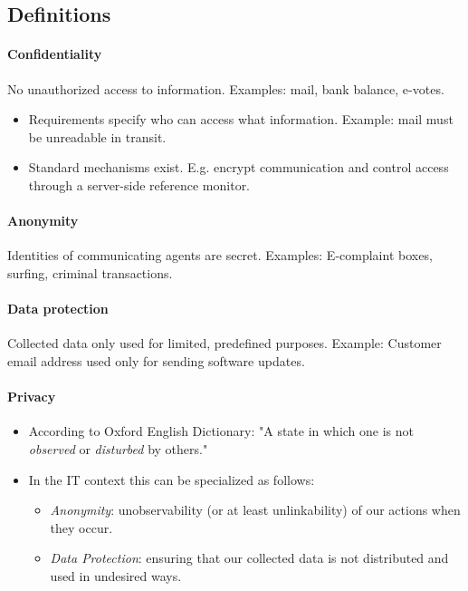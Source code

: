 \subsection{Definitions}

\paragraph{Confidentiality} No unauthorized access to information.
Examples: mail, bank balance, e-votes.

\begin{itemize}
    \item Requirements specify who can access what information.
    Example: mail must be unreadable in transit.
    \item Standard mechanisms exist. 
    E.g. encrypt communication and control access through a server-side reference monitor.
\end{itemize}

\paragraph{Anonymity} Identities of communicating agents are secret.
Examples: E-complaint boxes, surfing, criminal transactions.

\paragraph{Data protection} Collected data only used for limited, predefined purposes.
Example: Customer email address used only for sending software updates.

\paragraph{Privacy}

\begin{itemize}
    \item According to Oxford English Dictionary: "A state in which one is not \textit{observed} or \textit{disturbed} by others."
    \item In the IT context this can be specialized as follows:
    \begin{itemize}
        \item \emph{Anonymity}: unobservability (or at least unlinkability) of our actions when they occur.
        \item \emph{Data Protection}: ensuring that our collected data is not distributed and used in undesired ways.
    \end{itemize}
\end{itemize}


